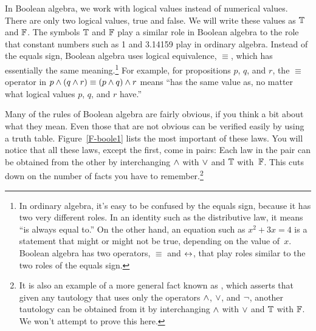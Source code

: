 In Boolean algebra, we work with logical values instead of
numerical values.  There are only two logical values, true
and false.  We will write these values as $\mathbb{T}$ and $\mathbb{F}$.
The symbols $\mathbb{T}$ and $\mathbb{F}$ play a similar role in Boolean algebra
to the role that constant numbers such as 1 and 3.14159 play 
in ordinary algebra.  Instead of the equals sign, Boolean algebra
uses logical equivalence, $\equiv$, which has essentially the
same meaning.\footnote{In ordinary algebra, it's easy to be confused
by the equals sign, because it has two very different roles.
In an identity such as the distributive law, it means
``is always equal to.''  On the other hand, an equation such as $x^2+3x=4$ is
a statement that might or might not be true, depending on the value of~$x$.
Boolean algebra has two operators, $\equiv$ and $\leftrightarrow$, that play
roles similar to the two roles of the equals sign.}
For example, for propositions $p$, $q$, and $r$, the $\equiv$ operator
in $p\wedge(q\wedge r)\equiv(p\wedge q)\wedge r$ means ``has the same value as,
no matter what logical values $p$, $q$, and $r$ have.''

Many of the rules of Boolean algebra are fairly obvious, if you think
a bit about what they mean.  Even those that are not obvious can
be verified easily by using a truth table.  Figure~\ref{F-boole1}
lists the most important of these laws.   You will
notice that all these laws, except the first, come in pairs:  Each 
law in the pair can be obtained from the other
by interchanging $\wedge$ with $\vee$ and $\mathbb{T}$ with~$\mathbb{F}$.  This cuts down
on the number of facts you have to remember.\footnote{It is also an
example of a more general fact known as , which asserts
that given any tautology that uses only
the operators $\wedge$, $\vee$, and $\lnot$, another tautology can be
obtained from it by interchanging $\wedge$ with $\vee$ and $\mathbb{T}$ with $\mathbb{F}$.
We won't attempt to prove this here.}



